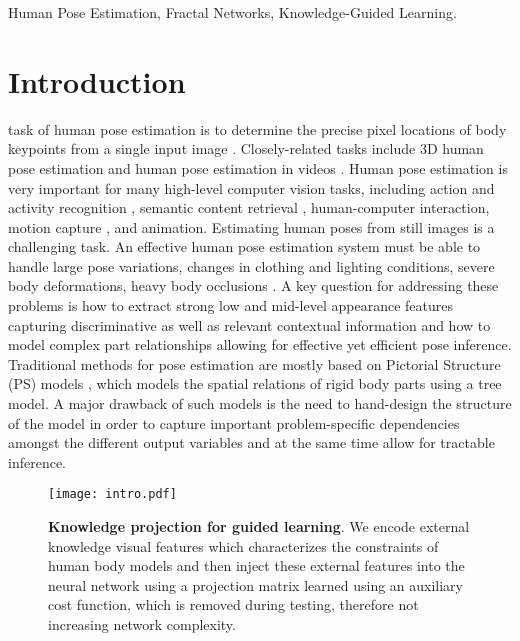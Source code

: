 \documentclass[journal ]{IEEEtran}
\begin{document}
\begin{IEEEkeywords}
Human Pose Estimation, Fractal Networks, Knowledge-Guided Learning.
\end{IEEEkeywords}






\IEEEpeerreviewmaketitle



\section{Introduction}
 task of human pose estimation is to determine the precise pixel locations of body keypoints from a single input image \cite{fu2017orgm, dantone2014body, zhang2014human, jiang2011human, zhao2015learning, li2017human, eichner2012human}. Closely-related tasks include 3D human pose estimation \cite{belagiannis20163d} and human pose estimation in videos \cite{zhou2016spatio, pfister2015flowing}.
Human pose estimation is very important for many high-level computer vision tasks, including action and activity recognition \cite{ikizler2012web, marcos2015let, cai2016effective}, semantic content retrieval \cite{ren2012visual}, human-computer interaction, motion capture \cite{ kadu2014automatic}, and animation.
Estimating human poses from still images is a challenging task. An effective human pose estimation system must be able to handle large pose variations, changes in clothing and lighting conditions, severe body deformations, heavy body occlusions \cite{toshev2014deeppose, tompson2014joint, newell2016stacked}.
A key question for addressing these problems is how to extract strong low and mid-level appearance features capturing discriminative as well as relevant contextual information and how to model complex part relationships allowing for effective yet efficient pose inference.
Traditional methods for pose estimation are mostly based on Pictorial Structure (PS) models \cite{sapp2013modec, pishchulin2013poselet, sun2011articulated, tian2012exploring, dantone2013human, karlinsky2012using}, which models the spatial relations of rigid body parts using a tree model.
A major drawback of such models is the need to hand-design the structure of the model in order to capture important problem-specific dependencies amongst the different output variables and at the same time allow for tractable inference.

\begin{figure}[!t]
\centering
\texttt{[image: intro.pdf]}
\caption{\textbf{Knowledge projection for guided learning}. We encode external knowledge visual features which characterizes the constraints of human body models and then inject these external features into the neural network using a projection matrix learned using an auxiliary cost function, which is removed during testing, therefore not increasing network complexity. }
\label{fig:intro}
\end{figure}
\end{document}

